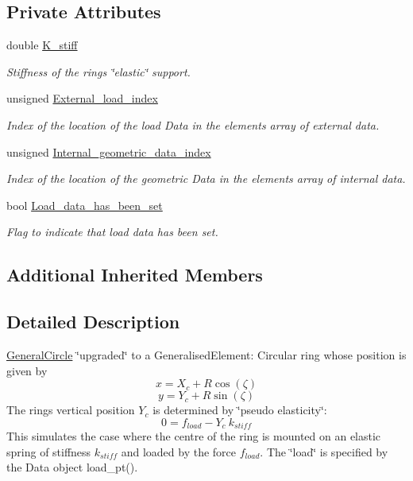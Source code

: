 \subsection*{Private Attributes}
\begin{DoxyCompactItemize}
\item 
double \hyperlink{classoomph_1_1ElasticallySupportedRingElement_ab6036a4f4e1434a2d068f6584f7c46e6}{K\+\_\+stiff}
\begin{DoxyCompactList}\small\item\em Stiffness of the ring\textquotesingle{}s \char`\"{}elastic\char`\"{} support. \end{DoxyCompactList}\item 
unsigned \hyperlink{classoomph_1_1ElasticallySupportedRingElement_a800f0a57477dc63df13aaea5c99a5f30}{External\+\_\+load\+\_\+index}
\begin{DoxyCompactList}\small\item\em Index of the location of the load Data in the element\textquotesingle{}s array of external data. \end{DoxyCompactList}\item 
unsigned \hyperlink{classoomph_1_1ElasticallySupportedRingElement_a6804e3aa5b62db4848416b2b69e89fe7}{Internal\+\_\+geometric\+\_\+data\+\_\+index}
\begin{DoxyCompactList}\small\item\em Index of the location of the geometric Data in the element\textquotesingle{}s array of internal data. \end{DoxyCompactList}\item 
bool \hyperlink{classoomph_1_1ElasticallySupportedRingElement_a98151ae912af71c1a78ddae80c4fbb04}{Load\+\_\+data\+\_\+has\+\_\+been\+\_\+set}
\begin{DoxyCompactList}\small\item\em Flag to indicate that load data has been set. \end{DoxyCompactList}\end{DoxyCompactItemize}
\subsection*{Additional Inherited Members}


\subsection{Detailed Description}
\hyperlink{classoomph_1_1GeneralCircle}{General\+Circle} \char`\"{}upgraded\char`\"{} to a Generalised\+Element\+: Circular ring whose position is given by \[ x = X_c + R \cos(\zeta) \] \[ y = Y_c + R \sin(\zeta) \] The ring\textquotesingle{}s vertical position $ Y_c $ is determined by \char`\"{}pseudo elasticity\char`\"{}\+: \[ 0 = f_{load} - Y_c \ k_{stiff} \] This simulates the case where the centre of the ring is mounted on an elastic spring of stiffness $ k_{stiff} $ and loaded by the force $ f_{load}. $ The \char`\"{}load\char`\"{} is specified by the Data object {\ttfamily load\+\_\+pt()}. 

